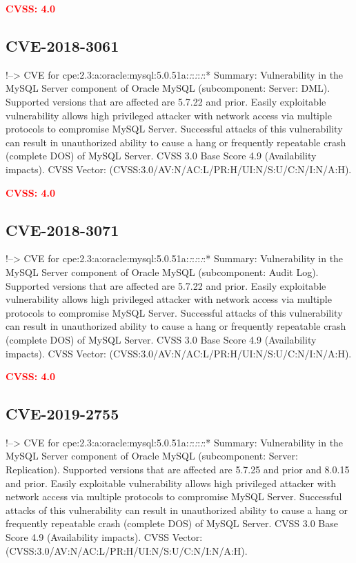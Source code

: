 \documentclass[a4paper, 12pt]{article}
\begin{document}
\textbf{\textcolor{red}{CVSS: 4.0}}

\hypertarget{cve-2018-3061}{%
\subsection{CVE-2018-3061}\label{cve-2018-3061}}

!--\textgreater{} CVE for
cpe:2.3:a:oracle:mysql:5.0.51a:\emph{:}:\emph{:}:\emph{:}:* Summary:
Vulnerability in the MySQL Server component of Oracle MySQL
(subcomponent: Server: DML). Supported versions that are affected are
5.7.22 and prior. Easily exploitable vulnerability allows high
privileged attacker with network access via multiple protocols to
compromise MySQL Server. Successful attacks of this vulnerability can
result in unauthorized ability to cause a hang or frequently repeatable
crash (complete DOS) of MySQL Server. CVSS 3.0 Base Score 4.9
(Availability impacts). CVSS Vector:
(CVSS:3.0/AV:N/AC:L/PR:H/UI:N/S:U/C:N/I:N/A:H).

\textbf{\textcolor{red}{CVSS: 4.0}}

\hypertarget{cve-2018-3071}{%
\subsection{CVE-2018-3071}\label{cve-2018-3071}}

!--\textgreater{} CVE for
cpe:2.3:a:oracle:mysql:5.0.51a:\emph{:}:\emph{:}:\emph{:}:* Summary:
Vulnerability in the MySQL Server component of Oracle MySQL
(subcomponent: Audit Log). Supported versions that are affected are
5.7.22 and prior. Easily exploitable vulnerability allows high
privileged attacker with network access via multiple protocols to
compromise MySQL Server. Successful attacks of this vulnerability can
result in unauthorized ability to cause a hang or frequently repeatable
crash (complete DOS) of MySQL Server. CVSS 3.0 Base Score 4.9
(Availability impacts). CVSS Vector:
(CVSS:3.0/AV:N/AC:L/PR:H/UI:N/S:U/C:N/I:N/A:H).

\textbf{\textcolor{red}{CVSS: 4.0}}

\hypertarget{cve-2019-2755}{%
\subsection{CVE-2019-2755}\label{cve-2019-2755}}

!--\textgreater{} CVE for
cpe:2.3:a:oracle:mysql:5.0.51a:\emph{:}:\emph{:}:\emph{:}:* Summary:
Vulnerability in the MySQL Server component of Oracle MySQL
(subcomponent: Server: Replication). Supported versions that are
affected are 5.7.25 and prior and 8.0.15 and prior. Easily exploitable
vulnerability allows high privileged attacker with network access via
multiple protocols to compromise MySQL Server. Successful attacks of
this vulnerability can result in unauthorized ability to cause a hang or
frequently repeatable crash (complete DOS) of MySQL Server. CVSS 3.0
Base Score 4.9 (Availability impacts). CVSS Vector:
(CVSS:3.0/AV:N/AC:L/PR:H/UI:N/S:U/C:N/I:N/A:H).
\end{document}
